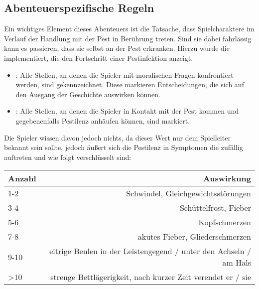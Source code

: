 \subsection{Abenteuerspezifische Regeln}

Ein wichtiges Element dieses Abenteuers ist die Tatsache, dass Spielcharaktere im Verlauf der Handlung mit der Pest in Berührung treten. Sind sie dabei fahrlässig kann es passieren, dass sie selbst an der Pest erkranken. Hierzu wurde die  implementiert, die den Fortschritt einer Pestinfektion anzeigt.

\begin{itemize}
  \item {}:
  Alle Stellen, an denen die Spieler mit moralischen Fragen konfrontiert werden, sind  gekennzeichnet. Diese markieren Entscheidungen, die sich auf den Ausgang der Geschichte auswirken können.

  \item {}:
  Alle Stellen, an denen die Spieler in Kontakt mit der Pest kommen und gegebenenfalls Pestilenz anhäufen können, sind  markiert.
\end{itemize}

Die Spieler wissen davon jedoch nichts, da dieser Wert nur dem Spielleiter bekannt sein sollte, jedoch äußert sich die Pestilenz in Symptomen die zufällig auftreten und wie folgt verschlüsselt sind:

\begin{tabular*}{\textwidth}{@{\extracolsep{\fill}} lr}
  \toprule
  Anzahl & Auswirkung \\
  \midrule
  1-2 & Schwindel, Gleichgewichtsstörungen \\
  3-4 & Schüttelfrost, Fieber \\
  5-6 & Kopfschmerzen \\
  7-8 & akutes Fieber, Gliederschmerzen \\
  9-10 & eitrige Beulen in der Leistengegend / unter den Achseln / am Hals \\
  >10 & strenge Bettlägerigkeit, nach kurzer Zeit verendet er / sie \\
  \bottomrule
\end{tabular*}
